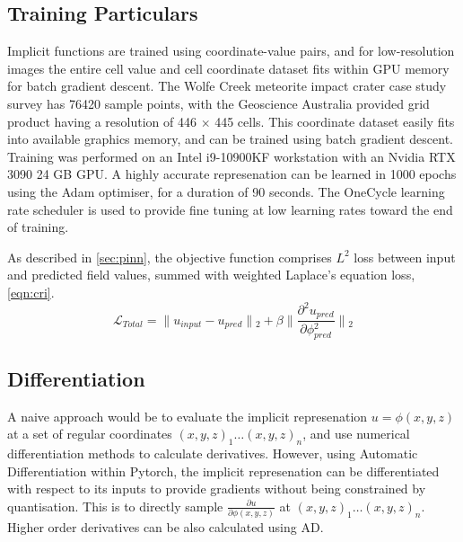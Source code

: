\documentclass[manuscript.tex]{subfiles}
\begin{document}
\subsection{Training Particulars}

Implicit functions are trained using coordinate-value pairs, and for low-resolution images the entire cell value and cell coordinate dataset fits within GPU memory for batch gradient descent.
The Wolfe Creek meteorite impact crater case study survey has \SI{76420}{} sample points, with the Geoscience Australia provided grid product having a resolution of 446 \(\times{}\) 445 cells.
This coordinate dataset easily fits into available graphics memory, and can be trained using batch gradient descent.
Training was performed on an Intel i9-10900KF workstation with an Nvidia RTX 3090 24 GB GPU\@.
A highly accurate represenation can be learned in 1000 epochs using the Adam optimiser, for a duration of 90 seconds.
The OneCycle learning rate scheduler \parencite{smithSuperconvergenceVeryFast2018} is used to provide fine tuning at low learning rates toward the end of training.

As described in \cref{sec:pinn}, the objective function comprises \(L^2\) loss between input and predicted field values, summed with weighted Laplace's equation loss, \cref{eqn:cri}.
\begin{equation}
    \label{eqn:cri}
    \mathcal{L}_{Total} = \lVert{}u_{input} - u_{pred}\rVert{}_{2} + \beta{} \lVert{}\frac{\partial^{2}{u_{pred}}}{\partial{}\phi{}_{pred}^{2}}\rVert{}_{2}
\end{equation}

\subsection{Differentiation}
A naive approach would be to evaluate the implicit represenation \(u = \phi{}(x, y, z)\) at a set of regular coordinates \({(x, y, z)}_1 \dots {(x,y,z)}_n\), and use numerical differentiation methods to calculate derivatives.
However, using Automatic Differentiation within Pytorch, the implicit represenation can be differentiated with respect to its inputs to provide gradients without being constrained by quantisation.
This is to directly sample \(\frac{\partial{u}}{\partial{\phi{}{(x,y,z)}}}\) at \({(x, y, z)}_1 \dots {(x,y,z)}_n\).
Higher order derivatives can be also calculated using AD\@.
\end{document}
